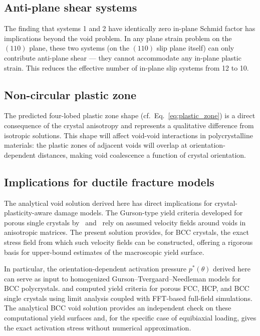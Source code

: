 \documentclass{svjour3} %
\begin{document}
\subsection{Anti-plane shear systems}

The finding that systems 1 and 2 have identically zero in-plane Schmid
factor has implications beyond the void problem. In any plane strain
problem on the $(110)$ plane, these two systems (on the $(110)$ slip plane
itself) can only contribute anti-plane shear --- they cannot accommodate
any in-plane plastic strain. This reduces the effective number of
in-plane slip systems from 12 to 10.

\subsection{Non-circular plastic zone}

The predicted four-lobed plastic zone shape
(cf.\ Eq.~\eqref{eq:plastic_zone}) is a direct consequence of the crystal
anisotropy and represents a qualitative difference from isotropic
solutions. This shape will affect void-void interactions in polycrystalline
materials: the plastic zones of adjacent voids will overlap at
orientation-dependent distances, making void coalescence a function of
crystal orientation.

\subsection{Implications for ductile fracture models}

The analytical void solution derived here has direct implications for
crystal-plasticity-aware damage models. The Gurson-type yield criteria
developed for porous single crystals by~\citet{keralavarma2010}
and~\citet{mbiakop2015} rely on assumed velocity fields around voids
in anisotropic matrices. The present solution provides, for BCC crystals,
the exact stress field from which such velocity fields can be
constructed, offering a rigorous basis for upper-bound estimates of the
macroscopic yield surface.

In particular, the orientation-dependent activation pressure
$p^*(\theta)$ derived here can serve as input to homogenized
Gurson--Tvergaard--Needleman models for BCC polycrystals.
\citet{paux2018} and \citet{senac2022,senac2023} computed yield criteria
for porous FCC, HCP, and BCC single crystals using limit analysis
coupled with FFT-based full-field simulations. The analytical BCC void
solution provides an independent check on these computational yield
surfaces and, for the specific case of equibiaxial loading, gives the
exact activation stress without numerical approximation.
\end{document}
